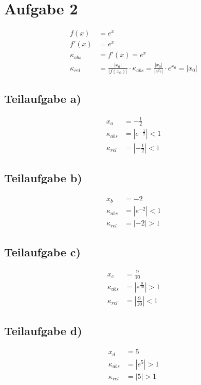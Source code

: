 \documentclass{llncs}
\begin{document}
\section*{Aufgabe 2}

\begin{align*}
f(x) &= e^x \\
f'(x) &= e^x \\
\kappa_{abs} &= f'(x) = e^x \\
\kappa_{rel} &= \frac{|x_0|}{|f(x_0)|} \cdot \kappa_{abs} = \frac{|x_0|}{|e^{x_0}|} \cdot e^{x_0} = |x_0|
\end{align*}

\subsection*{Teilaufgabe a)}

\begin{align*}
x_a &= -\frac{1}{2}\\
\kappa_{abs} &= |e^{-\frac{1}{2}}| < 1\\
\kappa_{rel} &= |-\frac{1}{2}| < 1
\end{align*}

\subsection*{Teilaufgabe b)}

\begin{align*}
x_b &= -2\\
\kappa_{abs} &= |e^{-2}| < 1\\
\kappa_{rel} &= |-2| > 1
\end{align*}

\subsection*{Teilaufgabe c)}

\begin{align*}
x_c &= \frac{9}{10}\\
\kappa_{abs} &= |e^{\frac{9}{10}}| > 1\\
\kappa_{rel} &= |\frac{9}{10}| < 1
\end{align*}

\subsection*{Teilaufgabe d)}

\begin{align*}
x_d &= 5\\
\kappa_{abs} &= |e^5| > 1\\
\kappa_{rel} &= |5| > 1
\end{align*}
\end{document}
